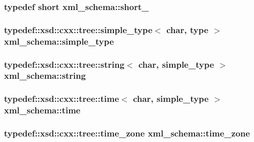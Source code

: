 \subsubsection[{\texorpdfstring{short\+\_\+}{short_}}]{\setlength{\rightskip}{0pt plus 5cm}typedef short {\bf xml\+\_\+schema\+::short\+\_\+}}\hypertarget{namespacexml__schema_a705720c1fed1575ccdcfd21cb7ab39ab}{}\label{namespacexml__schema_a705720c1fed1575ccdcfd21cb7ab39ab}
\subsubsection[{\texorpdfstring{simple\+\_\+type}{simple_type}}]{\setlength{\rightskip}{0pt plus 5cm}typedef\+::xsd\+::cxx\+::tree\+::simple\+\_\+type$<$ char, {\bf type} $>$ {\bf xml\+\_\+schema\+::simple\+\_\+type}}\hypertarget{namespacexml__schema_a2ee8a034145ffa154d46910b41892495}{}\label{namespacexml__schema_a2ee8a034145ffa154d46910b41892495}
\subsubsection[{\texorpdfstring{string}{string}}]{\setlength{\rightskip}{0pt plus 5cm}typedef\+::xsd\+::cxx\+::tree\+::string$<$ char, {\bf simple\+\_\+type} $>$ {\bf xml\+\_\+schema\+::string}}\hypertarget{namespacexml__schema_ac0cec83a330f0024e4e318b3deac5104}{}\label{namespacexml__schema_ac0cec83a330f0024e4e318b3deac5104}
\subsubsection[{\texorpdfstring{time}{time}}]{\setlength{\rightskip}{0pt plus 5cm}typedef\+::xsd\+::cxx\+::tree\+::time$<$ char, {\bf simple\+\_\+type} $>$ {\bf xml\+\_\+schema\+::time}}\hypertarget{namespacexml__schema_a59aaa57bb5452c1f6c6111f1501277d4}{}\label{namespacexml__schema_a59aaa57bb5452c1f6c6111f1501277d4}
\subsubsection[{\texorpdfstring{time\+\_\+zone}{time_zone}}]{\setlength{\rightskip}{0pt plus 5cm}typedef\+::xsd\+::cxx\+::tree\+::time\+\_\+zone {\bf xml\+\_\+schema\+::time\+\_\+zone}}\hypertarget{namespacexml__schema_ab32f228c8863c36bf48dbb7356c50c0e}{}\label{namespacexml__schema_ab32f228c8863c36bf48dbb7356c50c0e}

